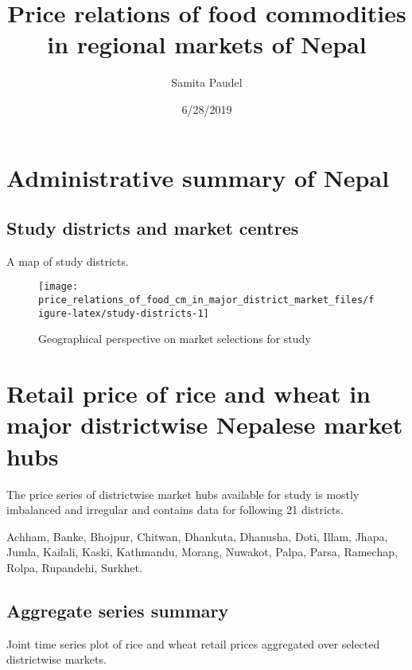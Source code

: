 \documentclass[12pt,]{article}
\title{Price relations of food commodities in regional markets of Nepal}
\author{Samita Paudel}
\date{6/28/2019}
\begin{document}
\maketitle

\hypertarget{administrative-summary-of-nepal}{%
\section{Administrative summary of Nepal}\label{administrative-summary-of-nepal}}

\hypertarget{study-districts-and-market-centres}{%
\subsection{Study districts and market centres}\label{study-districts-and-market-centres}}

A map of study districts.

\begin{figure}
\texttt{[image: price\_relations\_of\_food\_cm\_in\_major\_district\_market\_files/figure-latex/study-districts-1]} \caption{Geographical perspective on market selections for study}\label{fig:study-districts}
\end{figure}

\hypertarget{retail-price-of-rice-and-wheat-in-major-districtwise-nepalese-market-hubs}{%
\section{Retail price of rice and wheat in major districtwise Nepalese market hubs}\label{retail-price-of-rice-and-wheat-in-major-districtwise-nepalese-market-hubs}}

The price series of districtwise market hubs available for study is mostly imbalanced and irregular and contains data for following 21 districts.

Achham, Banke, Bhojpur, Chitwan, Dhankuta, Dhanusha, Doti, Illam, Jhapa, Jumla, Kailali, Kaski, Kathmandu, Morang, Nuwakot, Palpa, Parsa, Ramechap, Rolpa, Rupandehi, Surkhet.

\hypertarget{aggregate-series-summary}{%
\subsection{Aggregate series summary}\label{aggregate-series-summary}}

Joint time series plot of rice and wheat retail prices aggregated over selected districtwise markets.
\end{document}
